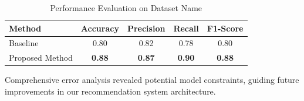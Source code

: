 \begin{table}[h]
    \centering
    \label{tab:performance}
    \begin{tabular}{lcccc}
        \toprule
        \textbf{Method} & \textbf{Accuracy} & \textbf{Precision} & \textbf{Recall} & \textbf{F1-Score} \\
        \midrule
        Baseline & 0.80 & 0.82 & 0.78 & 0.80 \\
        Proposed Method & \textbf{0.88} & \textbf{0.87} & \textbf{0.90} & \textbf{0.88} \\
        \bottomrule
    \end{tabular}
    \caption{Performance Evaluation on Dataset Name}
\end{table}

Comprehensive error analysis revealed potential model constraints, guiding future improvements in our recommendation system architecture.
